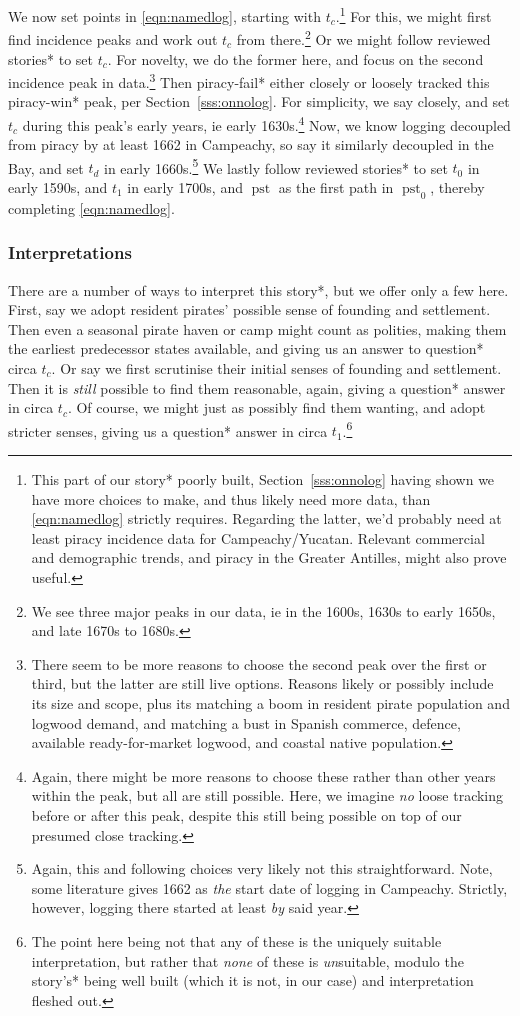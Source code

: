 \documentclass{amsart}
\DeclareMathOperator{\pst}{pst} %
\theoremstyle{definition}
\theoremstyle{remark}
\begin{document}
		We now set points in \ref{eqn:namedlog}, starting with \(t_c\).\footnote{This part of our story* poorly built, Section~\ref{sss:onnolog} having shown we have more choices to make, and thus likely need more data, than \ref{eqn:namedlog} strictly requires. Regarding the latter, we'd probably need at least piracy incidence data for Campeachy/Yucatan. Relevant commercial and demographic trends, and piracy in the Greater Antilles, might also prove useful.} For this, we might first find incidence peaks and work out \(t_c\) from there.\footnote{We see three major peaks in our data, ie in the 1600s, 1630s to early 1650s, and late 1670s to 1680s.} Or we might follow reviewed stories* to set \(t_c\). For novelty, we do the former here, and focus on the second incidence peak in data.\footnote{There seem to be more reasons to choose the second peak over the first or third, but the latter are still live options. Reasons likely or possibly include its size and scope, plus its matching a boom in resident pirate population and logwood demand, and matching a bust in Spanish commerce, defence, available ready-for-market logwood, and coastal native population.} Then piracy-fail* either closely or loosely tracked this piracy-win* peak, per Section~\ref{sss:onnolog}. For simplicity, we say closely, and set \(t_c\) during this peak's early years, ie early 1630s.\footnote{Again, there might be more reasons to choose these rather than other years within the peak, but all are still possible. Here, we imagine \emph{no} loose tracking before or after this peak, despite this still being possible on top of our presumed close tracking.} Now, we know logging decoupled from piracy by at least 1662 in Campeachy, so say it similarly decoupled in the Bay, and set \(t_d\) in early 1660s.\footnote{Again, this and following choices very likely not this straightforward. Note, some literature gives 1662 as \emph{the} start date of logging in Campeachy. Strictly, however, logging there started at least \emph{by} said year.} We lastly follow reviewed stories* to set \(t_0\) in early 1590s, and \(t_1\) in early 1700s, and \(\pst\) as the first path in \(\pst_0\), thereby completing \ref{eqn:namedlog}.
		\subsubsection{Interpretations}
		\label{sss:storyinterpret}
		There are a number of ways to interpret this story*, but we offer only a few here. First, say we adopt resident pirates' possible sense of founding and settlement. Then even a seasonal pirate haven or camp might count as polities, making them the earliest predecessor states available, and giving us an answer to question* circa \(t_c\). Or say we first scrutinise their initial senses of founding and settlement. Then it is \emph{still} possible to find them reasonable, again, giving a question* answer in circa \(t_c\). Of course, we might just as possibly find them wanting, and adopt stricter senses, giving us a question* answer in circa \(t_1\).\footnote{The point here being not that any of these is the uniquely suitable interpretation, but rather that \emph{none} of these is \emph{un}suitable, modulo the story's* being well built (which it is not, in our case) and interpretation fleshed out.}
%
%
%
\end{document}
